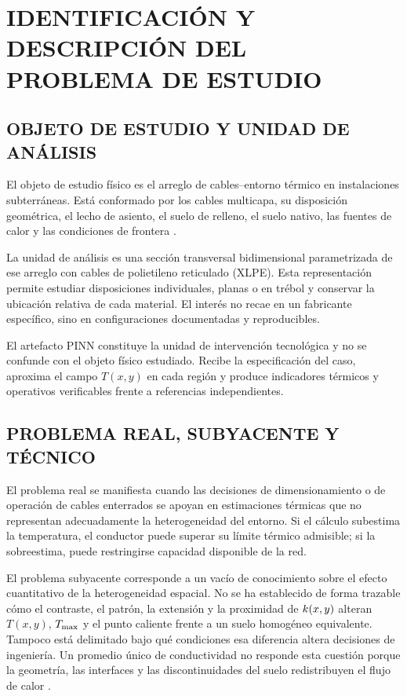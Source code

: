 \section{IDENTIFICACIÓN Y DESCRIPCIÓN DEL PROBLEMA DE ESTUDIO}
\label{sec:identificacion-problema}

\subsection{OBJETO DE ESTUDIO Y UNIDAD DE ANÁLISIS}

El objeto de estudio físico es el arreglo de cables--entorno térmico en instalaciones subterráneas. Está conformado por los cables multicapa, su disposición geométrica, el lecho de asiento, el suelo de relleno, el suelo nativo, las fuentes de calor y las condiciones de frontera \parencites[3--6]{enescu2021}{ieee442}[1,10]{kim2025}.

La unidad de análisis es una sección transversal bidimensional parametrizada de ese arreglo con cables de polietileno reticulado (XLPE). Esta representación permite estudiar disposiciones individuales, planas o en trébol y conservar la ubicación relativa de cada material. El interés no recae en un fabricante específico, sino en configuraciones documentadas y reproducibles.

El artefacto PINN constituye la unidad de intervención tecnológica y no se confunde con el objeto físico estudiado. Recibe la especificación del caso, aproxima el campo $T(x,y)$ en cada región y produce indicadores térmicos y operativos verificables frente a referencias independientes.

\subsection{PROBLEMA REAL, SUBYACENTE Y TÉCNICO}

El problema real se manifiesta cuando las decisiones de dimensionamiento o de operación de cables enterrados se apoyan en estimaciones térmicas que no representan adecuadamente la heterogeneidad del entorno. Si el cálculo subestima la temperatura, el conductor puede superar su límite térmico admisible; si la sobreestima, puede restringirse capacidad disponible de la red.

El problema subyacente corresponde a un vacío de conocimiento sobre el efecto cuantitativo de la heterogeneidad espacial. No se ha establecido de forma trazable cómo el contraste, el patrón, la extensión y la proximidad de $k(x,y)$ alteran $T(x,y)$, $T_{\max}$ y el punto caliente frente a un suelo homogéneo equivalente. Tampoco está delimitado bajo qué condiciones esa diferencia altera decisiones de ingeniería. Un promedio único de conductividad no responde esta cuestión porque la geometría, las interfaces y las discontinuidades del suelo redistribuyen el flujo de calor \parencites[4--6]{enescu2021}[3--4,93--99]{cigre2025}.

